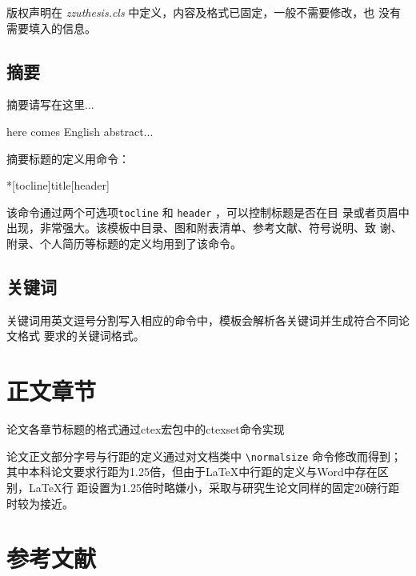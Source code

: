 版权声明在 \emph{zzuthesis.cls} 中定义，内容及格式已固定，一般不需要修改，也
没有需要填入的信息。

\subsection*{摘要}

\begin{latex}
\begin{cabstract}
 摘要请写在这里...
\end{cabstract}
\begin{eabstract}
 here comes English abstract...
\end{eabstract}
\end{latex}

摘要标题的定义用命令：
\begin{latex}
[header]
\end{latex}
该命令通过两个可选项\texttt{tocline} 和 \texttt{header} ，可以控制标题是否在目
录或者页眉中出现，非常强大。该模板中目录、图和附表清单、参考文献、符号说明、致
谢、附录、个人简历等标题的定义均用到了该命令。

\subsection*{关键词}

关键词用英文逗号分割写入相应的命令中，模板会解析各关键词并生成符合不同论文格式
要求的关键词格式。
\begin{latex}
\end{latex}

\section{正文章节}
\label{sec:mainbody}

论文各章节标题的格式通过ctex宏包中的ctexset命令实现
\begin{latex}
\end{latex}

论文正文部分字号与行距的定义通过对文档类中 \verb|\normalsize| 命令修改而得到；
其中本科论文要求行距为1.25倍，但由于\LaTeX{}中行距的定义与Word中存在区别，\LaTeX{}行
距设置为1.25倍时略嫌小，采取与研究生论文同样的固定20磅行距时较为接近。

\section{参考文献}
\label{sec:bib}

